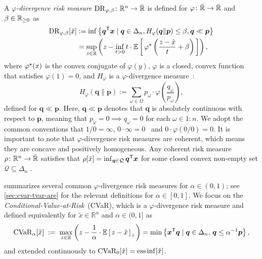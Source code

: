 A \emph{$\varphi$-divergence risk measure} $\operatorname{DR}_{\varphi, \beta }\colon \mathbb{R}^n \to  \bar{\mathbb{R}}$ is defined for $\varphi\colon \bar{\mathbb{R}} \to \bar{\mathbb{R}}$ and $\beta\in \mathbb{R}_{\ge 0}$ as~\cite{Ahmadi-Javid2012}
\begin{align} 
  \operatorname{DR}_{\varphi, \beta}[ \tilde{x} ]
\label{eq:fdiv-primal}
  &:= \inf \left\{\bm{q}^{\mathsf{T}} \bm{x} \mid \bm{q}\in \Delta_n, H_{\varphi}(\bm{q} \| \bm{p}) \le \beta,
    \bm{q} \ll \bm{p}
    \right\}
    \\
  \label{eq:fdiv-dual}
  &= \sup_{z\in \mathbb{R}} \left(  z - \inf_{t>0} t\cdot \mathbb{E}\left[\,  \varphi^{\star} \left( \frac{z - \tilde{x}}{t} + \beta \right) \,\right] \right),
\end{align}
where $\varphi^{\star}(x)$ is the convex conjugate of $\varphi(y)$, $\varphi$ is a closed, convex function that satisfies $\varphi(1) = 0$, and $H_{\varphi}$ is a $\varphi$-divergence measure~\cite{Bayraksan2015}:
\[
  H_\varphi(\bm{q} \| \bm{p}) := \sum_{\omega \in \Omega} p_{\omega} \cdot \varphi\left(\frac{q_{\omega}}{p_{\omega}}\right),
\]
defined for $\bm{q} \ll \bm{p}$. Here, $\bm{q} \ll \bm{p}$ denotes that $\bm{q}$ is absolutely continuous with respect to $\bm{p}$, meaning that $p_{\omega} = 0 \implies q_{\omega} = 0$ for each $\omega\in 1{:}n$. We adopt the common conventions that $1 / 0 = \infty$, $0 \cdot \infty = 0$~\cite{rockafellar1996variational} and $0 \cdot \varphi(0/0) = 0$. It is important to note that $\varphi$-divergence risk measures are coherent, which means they are concave and positively homogeneous. Any coherent risk measure $\rho\colon \mathbb{R}^n\to \bar{\mathbb{R}}$ satisfies that $\rho[\tilde{x}] = \inf_{\bm{q}\in\mathcal{Q}} \bm{q}^{\mathsf{T}}\bm{x}$ for some closed convex non-empty set $\mathcal{Q} \subseteq \Delta_n$ \citep[proposition~2.84]{Follmer2016}. 

 summarizes several common $\varphi$-divergence risk measures for $\alpha \in (0,1)$; see \cref{sec:cvar-tvar-are} for the relevant definitions for $\alpha\in [0,1]$. We focus on the \emph{Conditional-Value-at-Risk}~(CVaR), which is a $\varphi$-divergence risk measure and defined equivalently for $\tilde{x} \in \mathbb{R}^n$ and $\alpha \in (0,1]$ as~\cite{Follmer2016}
\begin{equation} \label{eq:primal_cvar}
    \operatorname{CVaR}_\alpha[ \tilde{x} ]
    \; :=\; 
    \max_{z \in \mathbb{R}} \left(z - \frac{1}{\alpha} \cdot \mathbb{E}\left[\, z -\tilde{x} \,\right]_+\right)
    = 
\min \left\{ \bm{x}^{\mathsf{T}} \bm{q} \mid \bm{q} \in \Delta_{n}, \, \bm{q} \le \alpha^{-1} \bm{p}
\right\},
\end{equation}
and extended continuously to $\operatorname{CVaR}_0[\tilde{x}] = \operatorname{ess}\inf[\tilde{x}]$.

